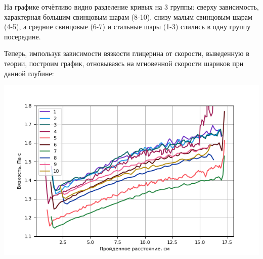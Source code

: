\documentclass[a4paper, 12pt]{article}
\begin{document}
    На графике отчётливо видно разделение кривых на 3 группы: сверху зависимость,
    характерная большим свинцовым шарам (8-10), снизу малым свинцовым шарам (4-5),
    а средние свинцовые (6-7) и стальные шары (1-3) слились в одну группу посередине.

    Теперь, импользуя зависимости вязкости глицерина от скорости, выведенную в теории, построим график,
    отновываясь на мгновенной скорости шариков при данной глубине:

    \includegraphics{viscosity-position.png}
\end{document}
